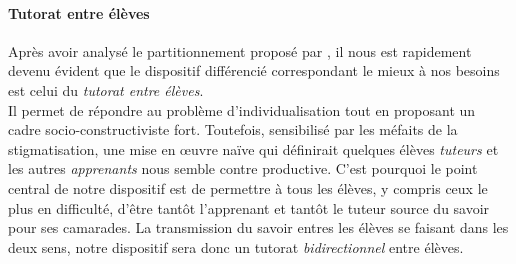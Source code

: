 





\paragraph{Tutorat entre élèves}
%
%
Après avoir analysé le partitionnement proposé par \cite{forget_penser_2018}, il nous est rapidement devenu évident que le dispositif différencié correspondant le mieux à nos besoins est celui du \emph{tutorat entre élèves}.
\\
Il permet de répondre au problème d'individualisation tout en proposant un cadre socio-constructiviste fort. Toutefois, sensibilisé par les méfaits de la stigmatisation, une mise en œuvre naïve qui définirait quelques élèves \emph{tuteurs} et les autres \emph{apprenants} nous semble contre productive. C'est pourquoi le point central de notre dispositif est de permettre à tous les élèves, y compris ceux le plus en difficulté, d'être tantôt l'apprenant et tantôt le tuteur source du savoir pour ses camarades. La transmission du savoir entres les élèves se faisant dans les deux sens, notre dispositif sera donc un tutorat \emph{bidirectionnel} entre élèves.


